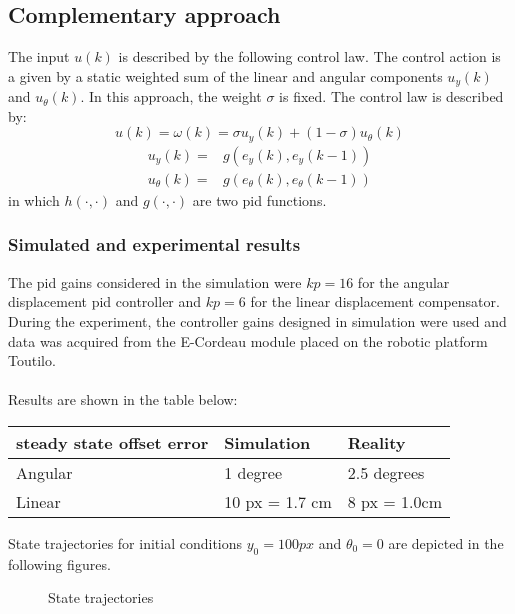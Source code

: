 {\color{PineGreen}\subsection{Complementary approach}\label{subsec:compl}}
The input $u(k)$ is described by the following control law. The control action is a given by a static weighted sum of the linear and angular components $u_{y}(k)$ and $u_{\theta}(k)$. In this approach, the weight $\sigma$ is fixed.
The control law is described by:
\begin{equation}
    u(k) = \omega(k) = \sigma u_{y}(k) +(1-\sigma) u_{\theta}(k)
\end{equation}
\begin{align}
    u_{y}(k) = & g(e_y(k),e_y(k-1))\\
   	u_{\theta}(k) = & g(e_{\theta}(k),e_{\theta}(k-1))
\end{align}
in which $h(\cdot,\cdot)$ and $g(\cdot,\cdot)$ are two pid functions.
\\
{\color{PineGreen}\subsubsection{Simulated and experimental results}\label{subsubsec:compl_res}}

The pid gains considered in the simulation were $kp = 16$ for the angular displacement pid
controller and $kp = 6$ for the linear displacement compensator. During the experiment, the controller gains designed in simulation were used and data was acquired from the E-Cordeau module placed on the robotic platform Toutilo.\\
\\
Results are shown in the table below:\\
\small
\noindent 
\begin{center}
    \begin{tabular}{ | p{5cm}| p{4cm} | p{4cm}|}
    \hline
    steady state offset error & Simulation & Reality \\ 
    \hline    
	Angular & 1 degree & 2.5 degrees	\\
    \hline    
	Linear & 10 px = 1.7 cm & 8 px = 1.0cm \\
    \hline    
    \end{tabular}
\end{center}
State trajectories for initial conditions $y_0=100px$ and $\theta_0=0$ are depicted in the following figures.
\begin{center}
	\begin{figure}[H]
    \centering
    \qquad
    \caption{State trajectories}%
    \label{fig:comple_res}%
\end{figure}
\end{center}

